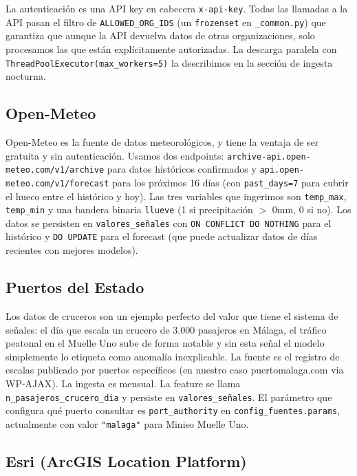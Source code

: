 \documentclass[12pt, a4paper]{article}
\begin{document}
La autenticación es una API key en cabecera \texttt{x-api-key}. Todas las llamadas a la API pasan el filtro de \texttt{ALLOWED\_ORG\_IDS} (un \texttt{frozenset} en \texttt{\_common.py}) que garantiza que aunque la API devuelva datos de otras organizaciones, solo procesamos las que están explícitamente autorizadas. La descarga paralela con \texttt{ThreadPoolExecutor(max\_workers=5)} la describimos en la sección de ingesta nocturna.

\subsection{Open-Meteo}

Open-Meteo es la fuente de datos meteorológicos, y tiene la ventaja de ser gratuita y sin autenticación. Usamos dos endpoints: \texttt{archive-api.open-meteo.com/v1/archive} para datos históricos confirmados y \texttt{api.open-meteo.com/v1/forecast} para los próximos 16 días (con \texttt{past\_days=7} para cubrir el hueco entre el histórico y hoy). Las tres variables que ingerimos son \texttt{temp\_max}, \texttt{temp\_min} y una bandera binaria \texttt{llueve} (1 si precipitación $>$ 0mm, 0 si no). Los datos se persisten en \texttt{valores\_señales} con \texttt{ON CONFLICT DO NOTHING} para el histórico y \texttt{DO UPDATE} para el forecast (que puede actualizar datos de días recientes con mejores modelos).

\subsection{Puertos del Estado}

Los datos de cruceros son un ejemplo perfecto del valor que tiene el sistema de señales: el día que escala un crucero de 3.000 pasajeros en Málaga, el tráfico peatonal en el Muelle Uno sube de forma notable y sin esta señal el modelo simplemente lo etiqueta como anomalía inexplicable. La fuente es el registro de escalas publicado por puertos específicos (en nuestro caso puertomalaga.com via WP-AJAX). La ingesta es mensual. La feature se llama \texttt{n\_pasajeros\_crucero\_dia} y persiste en \texttt{valores\_señales}. El parámetro que configura qué puerto consultar es \texttt{port\_authority} en \texttt{config\_fuentes.params}, actualmente con valor \texttt{"malaga"} para Miniso Muelle Uno.

\subsection{Esri (ArcGIS Location Platform)}
\end{document}
